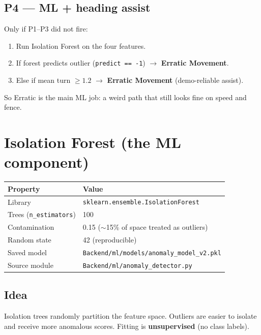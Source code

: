\documentclass[11pt,a4paper]{article}
\begin{document}
\subsection{P4 --- ML + heading assist}
Only if P1--P3 did not fire:
\begin{enumerate}[leftmargin=*]
  \item Run Isolation Forest on the four features.
  \item If forest predicts outlier (\texttt{predict == -1}) $\rightarrow$
        \textbf{Erratic Movement}.
  \item Else if mean turn $\geq 1.2$ $\rightarrow$ \textbf{Erratic Movement}
        (demo-reliable assist).
\end{enumerate}

So Erratic is the main ML job: a weird path that still looks fine on speed and fence.

\section{Isolation Forest (the ML component)}

\begin{center}
\begin{tabular}{@{}ll@{}}
\toprule
\textbf{Property} & \textbf{Value} \\
\midrule
Library & \texttt{sklearn.ensemble.IsolationForest} \\
Trees (\texttt{n\_estimators}) & 100 \\
Contamination & 0.15 ($\sim$15\% of space treated as outliers) \\
Random state & 42 (reproducible) \\
Saved model & \texttt{Backend/ml/models/anomaly\_model\_v2.pkl} \\
Source module & \texttt{Backend/ml/anomaly\_detector.py} \\
\bottomrule
\end{tabular}
\end{center}

\subsection{Idea}
Isolation trees randomly partition the feature space. Outliers are easier to isolate
and receive more anomalous scores. Fitting is \textbf{unsupervised} (no class labels).
\end{document}
